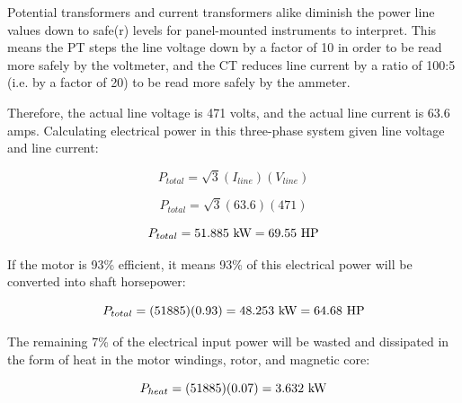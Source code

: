 
Potential transformers and current transformers alike diminish the power line values down to safe(r) levels for panel-mounted instruments to interpret.  This means the PT steps the line voltage down by a factor of 10 in order to be read more safely by the voltmeter, and the CT reduces line current by a ratio of 100:5 (i.e. by a factor of 20) to be read more safely by the ammeter.

Therefore, the actual line voltage is 471 volts, and the actual line current is 63.6 amps.  Calculating electrical power in this three-phase system given line voltage and line current:

$$P_{total} = \sqrt{3} (I_{line}) (V_{line})$$

$$P_{total} = \sqrt{3} (63.6) (471)$$

$$P_{total} = 51.885 \hbox{ kW} = 69.55 \hbox{ HP}$$

\vskip 10pt

If the motor is 93\% efficient, it means 93\% of this electrical power will be converted into shaft horsepower:

$$P_{total} = (51885)(0.93) = 48.253 \hbox{ kW} = 64.68 \hbox{ HP}$$

\vskip 10pt

The remaining 7\% of the electrical input power will be wasted and dissipated in the form of heat in the motor windings, rotor, and magnetic core:

$$P_{heat} = (51885)(0.07) = 3.632 \hbox{ kW}$$




